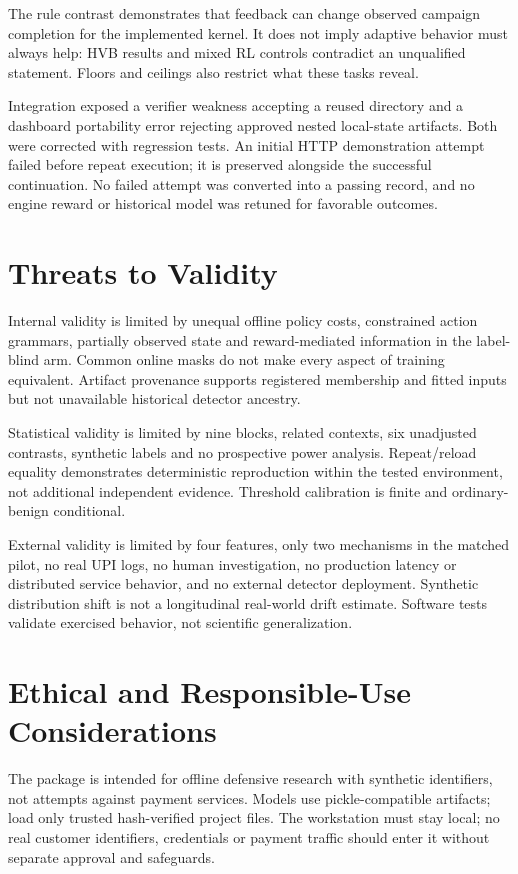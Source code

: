 \documentclass[conference]{IEEEtran}
\begin{document}
The rule contrast demonstrates that feedback can change observed campaign completion for the implemented kernel. It does not imply adaptive behavior must always help: HVB results and mixed RL controls contradict an unqualified statement. Floors and ceilings also restrict what these tasks reveal.

Integration exposed a verifier weakness accepting a reused directory and a dashboard portability error rejecting approved nested local-state artifacts. Both were corrected with regression tests. An initial HTTP demonstration attempt failed before repeat execution; it is preserved alongside the successful continuation. No failed attempt was converted into a passing record, and no engine reward or historical model was retuned for favorable outcomes.

\section{Threats to Validity}
Internal validity is limited by unequal offline policy costs, constrained action grammars, partially observed state and reward-mediated information in the label-blind arm. Common online masks do not make every aspect of training equivalent. Artifact provenance supports registered membership and fitted inputs but not unavailable historical detector ancestry.

Statistical validity is limited by nine blocks, related contexts, six unadjusted contrasts, synthetic labels and no prospective power analysis. Repeat/reload equality demonstrates deterministic reproduction within the tested environment, not additional independent evidence. Threshold calibration is finite and ordinary-benign conditional.

External validity is limited by four features, only two mechanisms in the matched pilot, no real UPI logs, no human investigation, no production latency or distributed service behavior, and no external detector deployment. Synthetic distribution shift is not a longitudinal real-world drift estimate. Software tests validate exercised behavior, not scientific generalization.

\section{Ethical and Responsible-Use Considerations}
The package is intended for offline defensive research with synthetic identifiers, not attempts against payment services. Models use pickle-compatible artifacts; load only trusted hash-verified project files. The workstation must stay local; no real customer identifiers, credentials or payment traffic should enter it without separate approval and safeguards.
\end{document}

